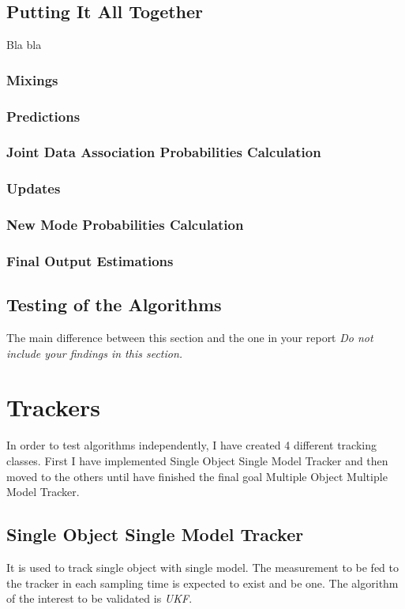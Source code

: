 \documentclass[peerreview]{IEEEtran}
\begin{document}
\subsection{Putting It All Together}
Bla bla

\subsubsection{Mixings}
\subsubsection{Predictions}
\subsubsection{Joint Data Association Probabilities Calculation}
\subsubsection{Updates}
\subsubsection{New Mode Probabilities Calculation}
\subsubsection{Final Output Estimations}


\subsection{Testing of the Algorithms}
The main difference between this section and the one in your report 
\emph{Do not include your findings in this section.}

\section{Trackers}
In order to test algorithms independently, I have created 4 different tracking classes. First I have implemented Single Object Single Model Tracker and then moved to the others until have finished the final goal Multiple Object Multiple Model Tracker.

\subsection{Single Object Single Model Tracker}

It is used to track single object with single model. The measurement to be fed to the tracker in each sampling time is expected to exist and be one. The algorithm of the interest to be validated is \emph{UKF}.
\end{document}
